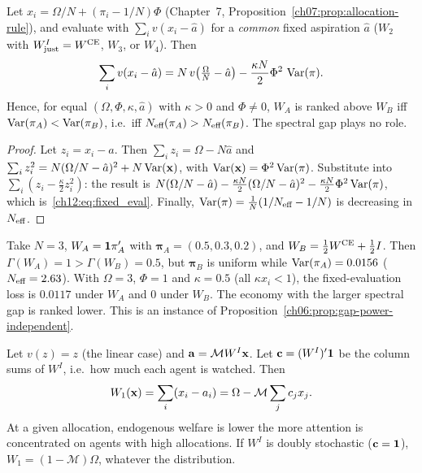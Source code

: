 \documentclass[../structural_economics_book.tex]{subfiles}
\begin{document}
\begin{proposition}\label{ch12:thm:structural_welfare}
Let $x_i = \Omega/N + (\pi_i - 1/N)\Phi$ (Chapter~7, Proposition~\ref{ch07:prop:allocation-rule}), and evaluate with $\sum_i v(x_i - \hat{a})$ for a \textit{common} fixed aspiration $\hat{a}$ ($W_2$ with $W^I_{\text{just}} = W^{\text{CE}}$, $W_3$, or $W_4$). Then
\begin{equation}\label{ch12:eq:fixed_eval}
\sum_i v(x_i - \hat{a}) = N\,v\!\left(\tfrac{\Omega}{N} - \hat{a}\right) - \frac{\kappa N}{2}\Phi^2\,\operatorname{Var}(\pi).
\end{equation}
Hence, for equal $(\Omega, \Phi, \kappa, \hat{a})$ with $\kappa > 0$ and $\Phi \neq 0$, $W_A$ is ranked above $W_B$ iff $\operatorname{Var}(\pi_A) < \operatorname{Var}(\pi_B)$, i.e.\ iff $N_{\text{eff}}(\pi_A) > N_{\text{eff}}(\pi_B)$. The spectral gap plays no role.
\end{proposition}

\begin{proof}
Let $z_i = x_i - \hat{a}$. Then $\sum_i z_i = \Omega - N\hat{a}$ and $\sum_i z_i^2 = N(\Omega/N - \hat{a})^2 + N\operatorname{Var}(\mathbf{x})$, with $\operatorname{Var}(\mathbf{x}) = \Phi^2\operatorname{Var}(\pi)$. Substitute into $\sum_i(z_i - \frac{\kappa}{2}z_i^2)$: the result is $N(\Omega/N - \hat{a}) - \frac{\kappa N}{2}(\Omega/N - \hat{a})^2 - \frac{\kappa N}{2}\Phi^2\operatorname{Var}(\pi)$, which is~\eqref{ch12:eq:fixed_eval}. Finally, $\operatorname{Var}(\pi) = \frac{1}{N}(1/N_{\text{eff}} - 1/N)$ is decreasing in $N_{\text{eff}}$.
\end{proof}

\begin{remark}\label{ch12:rem:gamma}
Take $N = 3$, $W_A = \mathbf{1}\pi_A'$ with $\boldsymbol{\pi}_A = (0.5, 0.3, 0.2)$, and $W_B = \frac12W^{\text{CE}} + \frac12 I$. Then $\Gamma(W_A) = 1 > \Gamma(W_B) = 0.5$, but $\boldsymbol{\pi}_B$ is uniform while $\operatorname{Var}(\pi_A) = 0.0156$ ($N_{\text{eff}} = 2.63$). With $\Omega = 3$, $\Phi = 1$ and $\kappa = 0.5$ (all $\kappa x_i < 1$), the fixed-evaluation loss is $0.0117$ under $W_A$ and $0$ under $W_B$. The economy with the larger spectral gap is ranked lower. This is an instance of Proposition~\ref{ch06:prop:gap-power-independent}.
\end{remark}

\begin{proposition}\label{ch12:prop:endo_linear}
Let $v(z) = z$ (the linear case) and $\mathbf{a} = \mathcal{M}W^I\mathbf{x}$. Let $\mathbf{c} = (W^I)'\mathbf{1}$ be the column sums of $W^I$, i.e.\ how much each agent is watched. Then
\begin{equation}\label{ch12:eq:endo_linear}
W_1(\mathbf{x}) = \sum_i (x_i - a_i) = \Omega - \mathcal{M}\sum_j c_j x_j.
\end{equation}
At a given allocation, endogenous welfare is lower the more attention is concentrated on agents with high allocations. If $W^I$ is doubly stochastic ($\mathbf{c} = \mathbf{1}$), $W_1 = (1 - \mathcal{M})\Omega$, whatever the distribution.
\end{proposition}
\end{document}
